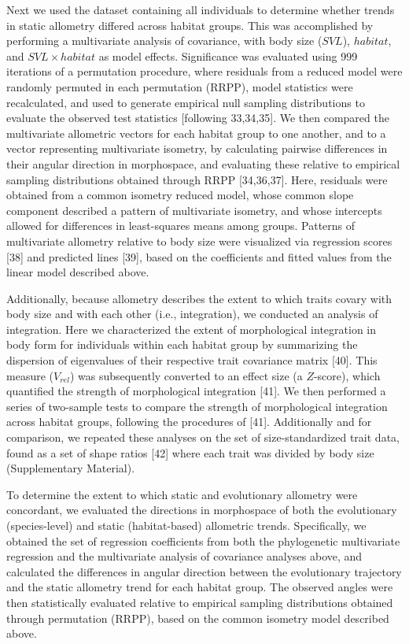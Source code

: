 \documentclass[
  11pt,
]{article}
\begin{document}
Next we used the dataset containing all individuals to determine whether
trends in static allometry differed across habitat groups. This was
accomplished by performing a multivariate analysis of covariance, with
body size (\(SVL\)), \(habitat\), and \(SVL\times habitat\) as model
effects. Significance was evaluated using 999 iterations of a
permutation procedure, where residuals from a reduced model were
randomly permuted in each permutation (RRPP), model statistics were
recalculated, and used to generate empirical null sampling distributions
to evaluate the observed test statistics {[}following 33,34,35{]}. We
then compared the multivariate allometric vectors for each habitat group
to one another, and to a vector representing multivariate isometry, by
calculating pairwise differences in their angular direction in
morphospace, and evaluating these relative to empirical sampling
distributions obtained through RRPP {[}34,36,37{]}. Here, residuals were
obtained from a common isometry reduced model, whose common slope
component described a pattern of multivariate isometry, and whose
intercepts allowed for differences in least-squares means among groups.
Patterns of multivariate allometry relative to body size were visualized
via regression scores {[}38{]} and predicted lines {[}39{]}, based on
the coefficients and fitted values from the linear model described
above. \hfill\break

Additionally, because allometry describes the extent to which traits
covary with body size and with each other (i.e., integration), we
conducted an analysis of integration. Here we characterized the extent
of morphological integration in body form for individuals within each
habitat group by summarizing the dispersion of eigenvalues of their
respective trait covariance matrix {[}40{]}. This measure (\(V_{rel}\))
was subsequently converted to an effect size (a \(Z\)-score), which
quantified the strength of morphological integration {[}41{]}. We then
performed a series of two-sample tests to compare the strength of
morphological integration across habitat groups, following the
procedures of {[}41{]}. Additionally and for comparison, we repeated
these analyses on the set of size-standardized trait data, found as a
set of shape ratios {[}42{]} where each trait was divided by body size
(Supplementary Material). \hfill\break

To determine the extent to which static and evolutionary allometry were
concordant, we evaluated the directions in morphospace of both the
evolutionary (species-level) and static (habitat-based) allometric
trends. Specifically, we obtained the set of regression coefficients
from both the phylogenetic multivariate regression and the multivariate
analysis of covariance analyses above, and calculated the differences in
angular direction between the evolutionary trajectory and the static
allometry trend for each habitat group. The observed angles were then
statistically evaluated relative to empirical sampling distributions
obtained through permutation (RRPP), based on the common isometry model
described above. \hfill\break
\end{document}
